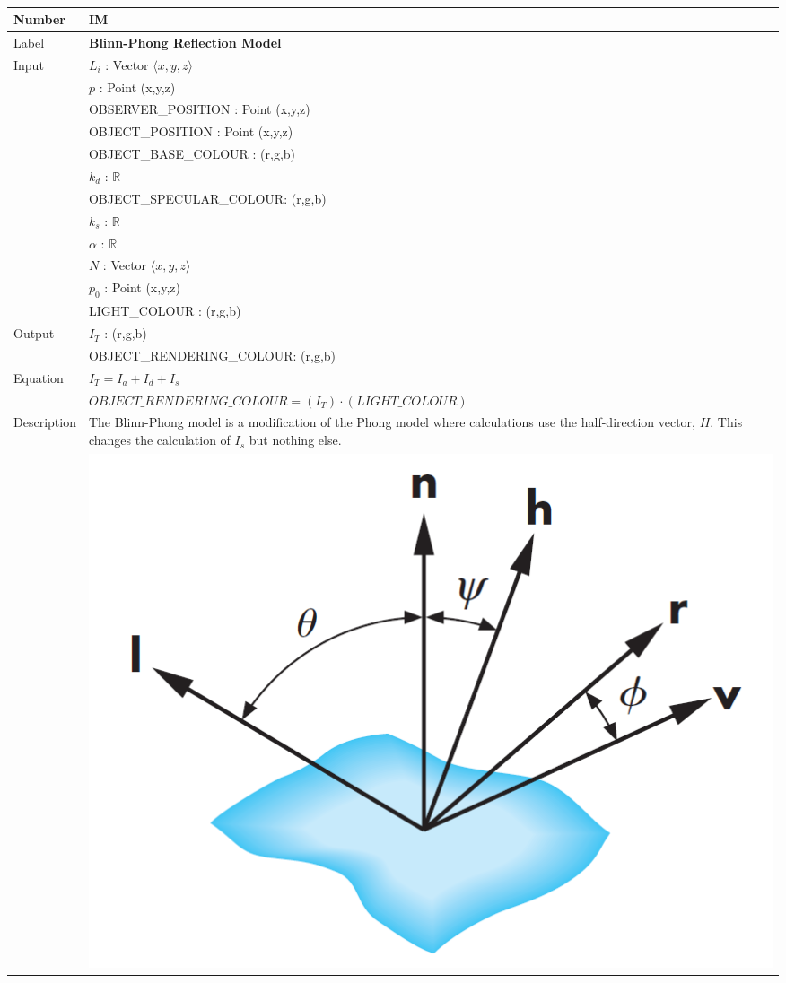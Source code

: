 \documentclass[12pt]{article}
\newcommand{\colAwidth}{0.13\textwidth}
\newcommand{\colBwidth}{0.82\textwidth}
\newcounter{instnum} %
\begin{document}
~\newline

\noindent
\begin{minipage}{\textwidth}
	\renewcommand*{\arraystretch}{1.5}
	\begin{tabular}{| p{\colAwidth} | p{\colBwidth}|}
		\hline
		\rowcolor[gray]{0.9}
		Number& IM{instnum}\theinstnum \label{IM_Blinn_Phong}\\
		\hline
		Label& \bf Blinn-Phong Reflection Model\\
		\hline
		\multirow{12}{*}{Input} & $L_{i}$ : Vector $\langle x, y ,z \rangle$\\
		& $p$ : Point (x,y,z)\\
		& OBSERVER\_POSITION : Point (x,y,z)\\		
		& OBJECT\_POSITION : Point (x,y,z)\\
		& OBJECT\_BASE\_COLOUR : (r,g,b)\\
		& $k_{d}$ : $\mathbb{R}$\\
		& OBJECT\_SPECULAR\_COLOUR: (r,g,b)\\
		& $k_{s}$ : $\mathbb{R}$ \\
		& $\alpha$ : $\mathbb{R}$ \\
		& $N$ : Vector $\langle x, y ,z \rangle$\\
		& $p_{0}$ : Point (x,y,z)\\		
		& LIGHT\_COLOUR : (r,g,b)\\	
		\hline
		\multirow{2}{*}{Output} & $I_{T}$ : (r,g,b)\\
		& OBJECT\_RENDERING\_COLOUR: (r,g,b)\\
		\hline
		Equation & $I_{T} = I_{a} + I_{d} + I_{s}$\\
		& $OBJECT\_RENDERING\_COLOUR = (I_{T})\cdot(LIGHT\_COLOUR)$\\
		Description& The Blinn-Phong model is a modification of the Phong model 
		where calculations use the half-direction vector, $H$. This changes the 
		calculation of $I_{s}$ but nothing else.\\
		&\includegraphics[scale=0.4]{./images/blinn-phong-reflection-model-vectors}\\
		\hline
	\end{tabular}
\end{minipage}\\
\end{document}

